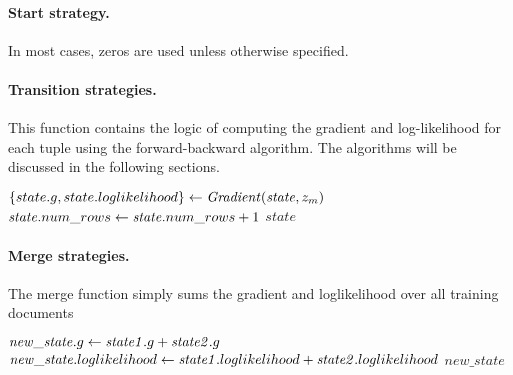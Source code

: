 \paragraph{Start strategy.}
In most cases, zeros are used unless otherwise specified.

\paragraph{Transition strategies.}
This function contains the logic of computing the gradient and log-likelihood for each tuple using the forward-backward
algorithm. The algorithms will be discussed in the following sections.

\begin{algorithm} \label{alg:transition-lbfgs}
\begin{algorithmic}[1]
    \State $\{state.g,state.loglikelihood\}  \leftarrow \mathit{Gradient}(\mathit{state}, z_m)$
    \State $\mathit{state}.num\_rows \leftarrow \mathit{state}.num\_rows + 1$
    \State \Return $\mathit{state}$
\end{algorithmic}
\end{algorithm}


\paragraph{Merge strategies.}
The merge function simply sums the gradient and loglikelihood over all training documents 
\begin{algorithm} \label{alg:merge-lbfgs}
\begin{algorithmic}[1]
    \State $\mathit{new\_state}.g \leftarrow \mathit{state1}.g + \mathit{state2}.g$
    \State $\mathit{new\_state}.loglikelihood \leftarrow \mathit{state1}.loglikelihood + \mathit{state2}.loglikelihood$
    \State \Return $\mathit{new\_state}$
\end{algorithmic}
\end{algorithm}


